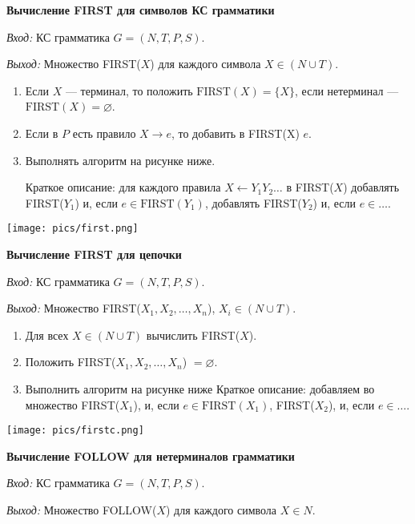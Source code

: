 \textbf{Вычисление FIRST для символов КС грамматики}

\textit{Вход:} КС грамматика $G = (N, T, P, S)$.

\textit{Выход:} Множество FIRST($X$) для каждого символа $X \in (N \cup T)$.

\begin{enumerate}
    \item Если $X$ --- терминал, то положить $\text{FIRST}(X) = \{X\}$, если нетерминал --- $\text{FIRST}(X) = \varnothing$.
    \item Если в $P$ есть правило $X \rightarrow e$, то добавить в FIRST(X) $e$.
    \item Выполнять алгоритм на рисунке ниже.
    
    Краткое описание: для каждого правила $X \leftarrow Y_1 Y_2 \dots$ в FIRST($X$) добавлять FIRST($Y_1$) и, если $e \in \text{FIRST}(Y_1)$, добавлять FIRST($Y_2$) и, если $e \in \dots$. 
\end{enumerate}

\texttt{[image: pics/first.png]}

\textbf{Вычисление FIRST для цепочки}

\textit{Вход:} КС грамматика $G = (N, T, P, S)$.

\textit{Выход:} Множество FIRST($X_1, X_2, \dots, X_n$), $X_i \in (N \cup T)$.


\begin{enumerate}
    \item Для всех $X \in (N \cup T)$ вычислить FIRST($X$).
    \item Положить FIRST($X_1, X_2, \dots, X_n$) $ = \varnothing$.
    \item Выполнить алгоритм на рисунке ниже \newline
    Краткое описание: добавляем во множество FIRST($X_1$), и, если $e \in \text{FIRST}(X_1)$, FIRST($X_2$), и, если $e \in \dots$.
\end{enumerate}

\texttt{[image: pics/firstc.png]}

\textbf{Вычисление FOLLOW для нетерминалов грамматики}

\textit{Вход:} КС грамматика $G = (N, T, P, S)$.

\textit{Выход:} Множество FOLLOW($X$) для каждого символа $X \in N$.

